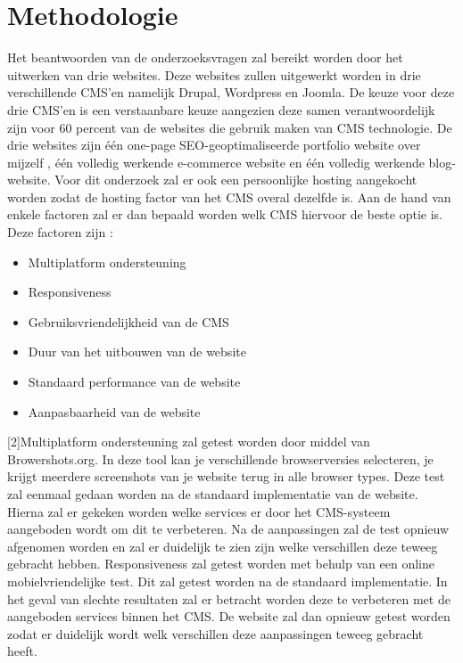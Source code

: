 \section{Methodologie}
\label{sec:methodologie}

Het beantwoorden van de onderzoeksvragen zal bereikt worden door het uitwerken van drie websites. Deze websites zullen uitgewerkt worden in drie verschillende CMS'en namelijk Drupal, Wordpress en Joomla. De keuze voor deze drie CMS'en is een verstaanbare keuze aangezien deze samen verantwoordelijk zijn voor 60 percent van de websites die gebruik maken van CMS technologie\autocite{BWPL2017}. De drie websites zijn één one-page SEO-geoptimaliseerde portfolio website over mijzelf , één volledig werkende e-commerce website en één volledig werkende blog-website. Voor dit onderzoek zal er ook een persoonlijke hosting aangekocht worden zodat de hosting factor van het CMS overal dezelfde is. Aan de hand van enkele factoren zal er dan bepaald worden welk CMS hiervoor de beste optie is.
Deze factoren zijn :
\begin{itemize}
	\item Multiplatform ondersteuning
	\item Responsiveness
	\item Gebruiksvriendelijkheid van de CMS
	\item Duur van het uitbouwen van de website
	\item Standaard performance van de website
	\item Aanpasbaarheid van de website
\end{itemize}[2]Multiplatform ondersteuning zal getest worden door middel van Browershots.org. In deze tool kan je verschillende browserversies selecteren, je krijgt meerdere screenshots van je website terug in alle browser types. Deze test zal eenmaal gedaan worden na de standaard implementatie van de website. Hierna zal er gekeken worden welke services er door het CMS-systeem aangeboden wordt om dit te verbeteren. Na de aanpassingen zal de test opnieuw afgenomen worden en zal er duidelijk te zien zijn  welke verschillen deze teweeg gebracht hebben.
Responsiveness zal getest worden met behulp van een online mobielvriendelijke test. Dit zal getest worden na de standaard implementatie. In het geval van slechte resultaten zal er betracht worden deze te  verbeteren met de aangeboden services binnen het CMS. De website zal dan opnieuw getest worden zodat er duidelijk wordt welk verschillen deze aanpassingen teweeg gebracht heeft.
